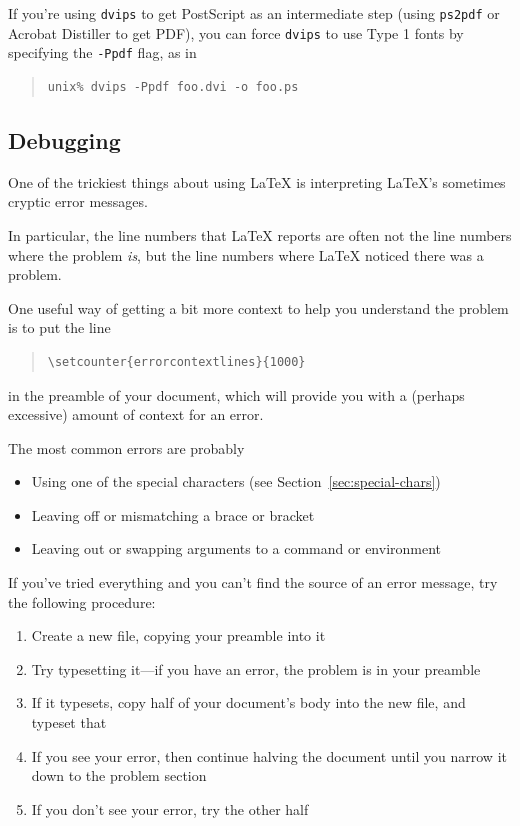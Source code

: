 \documentclass{icmmcm}
\newcommand{\prog}[1]{\texttt{#1}\xspace}
\newcommand{\latex}{\LaTeX\xspace}
\begin{document}
{If you're using \prog{dvips} to get PostScript as an intermediate step
(using \prog{ps2pdf} or Acrobat Distiller to get PDF), you can force
\prog{dvips} to use Type 1 fonts by specifying the \prog{-Ppdf} flag,
as in
\begin{quote}
\begin{verbatim}
unix% dvips -Ppdf foo.dvi -o foo.ps
\end{verbatim}
\end{quote}


\subsection{Debugging}

One of the trickiest things about using \latex is interpreting
\latex's sometimes cryptic error messages.

In particular, the line numbers that \latex reports are often not the
line numbers where the problem \emph{is}, but the line numbers where
\latex noticed there was a problem.

One useful way of getting a bit more context to help you understand
the problem is to put the line
\begin{quote}
\begin{verbatim}
\setcounter{errorcontextlines}{1000}
\end{verbatim}
\end{quote}
in the preamble of your document, which will provide you with a
(perhaps excessive) amount of context for an error.

The most common errors are probably
\begin{itemize}
\item Using one of the special characters (see
Section~\ref{sec:special-chars})
\item Leaving off or mismatching a brace or bracket
\item Leaving out or swapping arguments to a command or environment
\end{itemize}

If you've tried everything and you can't find the source of an error
message, try the following procedure:
\begin{enumerate}
\item Create a new file, copying your preamble into it
\item Try typesetting it---if you have an error, the problem is in
  your preamble
\item If it typesets, copy half of your document's body into the new
  file, and typeset that
\item If you see your error, then continue halving the document until
  you narrow it down to the problem section
\item If you don't see your error, try the other half
\end{enumerate}



}
\end{document}

